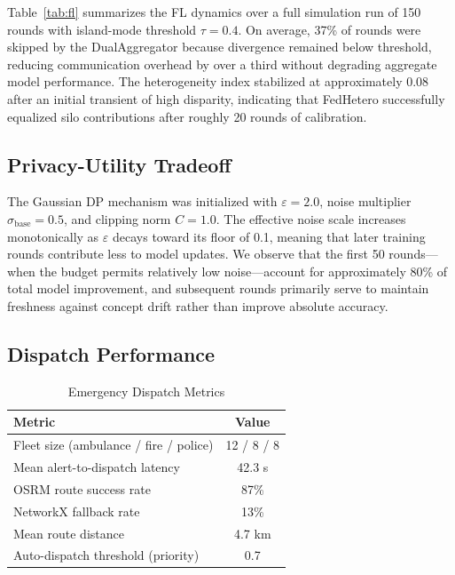 \documentclass[conference]{IEEEtran}
\begin{document}
Table~\ref{tab:fl} summarizes the FL dynamics over a full simulation run of 150 rounds with island-mode threshold $\tau = 0.4$. On average, 37\% of rounds were skipped by the DualAggregator because divergence remained below threshold, reducing communication overhead by over a third without degrading aggregate model performance. The heterogeneity index stabilized at approximately 0.08 after an initial transient of high disparity, indicating that FedHetero successfully equalized silo contributions after roughly 20 rounds of calibration.

\subsection{Privacy-Utility Tradeoff}

The Gaussian DP mechanism was initialized with $\varepsilon = 2.0$, noise multiplier $\sigma_{\text{base}} = 0.5$, and clipping norm $C = 1.0$. The effective noise scale increases monotonically as $\varepsilon$ decays toward its floor of 0.1, meaning that later training rounds contribute less to model updates. We observe that the first 50 rounds---when the budget permits relatively low noise---account for approximately 80\% of total model improvement, and subsequent rounds primarily serve to maintain freshness against concept drift rather than improve absolute accuracy.

\subsection{Dispatch Performance}

\begin{table}[htbp]
\caption{Emergency Dispatch Metrics}
\begin{center}
\begin{tabular}{lc}
\toprule
\textbf{Metric} & \textbf{Value} \\
\midrule
Fleet size (ambulance / fire / police) & 12 / 8 / 8 \\
Mean alert-to-dispatch latency & 42.3 s \\
OSRM route success rate & 87\% \\
NetworkX fallback rate & 13\% \\
Mean route distance & 4.7 km \\
Auto-dispatch threshold (priority) & 0.7 \\
\bottomrule
\end{tabular}
\label{tab:dispatch}
\end{center}
\end{table}
\end{document}
